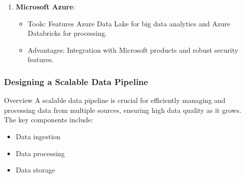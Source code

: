 \documentclass{beamer}
\begin{document}
\begin{frame}[fragile]
\begin{itemize}
\begin{enumerate}
            \item \textbf{Microsoft Azure}:
                \begin{itemize}
                    \item Tools: Features Azure Data Lake for big data analytics and Azure Databricks for processing.
                    \item Advantages: Integration with Microsoft products and robust security features.
                \end{itemize}
        \end{enumerate}
    \end{itemize}
\end{frame}

\begin{frame}[fragile]
    \frametitle{Designing a Scalable Data Pipeline}
    \begin{block}{Overview}
        A scalable data pipeline is crucial for efficiently managing and processing data from multiple sources, ensuring high data quality as it grows. The key components include:
        \begin{itemize}
            \item Data ingestion
            \item Data processing
            \item Data storage
        \end{itemize}
    \end{block}
\end{frame}
\end{document}
